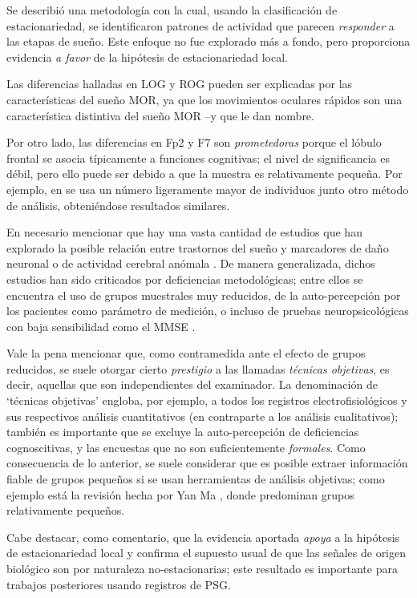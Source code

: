 \documentclass[12pt,letterpaper]{book}
\begin{document}
Se describió una metodología con la cual, usando la clasificación de estacionariedad, se identificaron patrones de actividad que parecen \textit{responder} a las etapas de sueño.
%
Este enfoque no fue explorado más a fondo, pero proporciona evidencia \textit{a favor} de la hipótesis de estacionariedad local.

Las diferencias halladas en LOG y ROG pueden ser explicadas por las características del sueño MOR, ya que los movimientos oculares rápidos son una característica distintiva del sueño MOR --y que le dan nombre.

Por otro lado, las diferencias en Fp2 y F7 son \textit{prometedoras} porque el lóbulo frontal se asocia típicamente a funciones cognitivas; el nivel de significancia es débil, pero ello puede ser debido a que la muestra es relativamente pequeña.
%
Por ejemplo, en \cite{FRONTIERS} se usa un número ligeramente mayor de individuos junto otro método de análisis, obteniéndose resultados similares.

En necesario mencionar que hay una vasta cantidad de estudios que han explorado la posible relación entre trastornos del sueño y marcadores de daño neuronal o de actividad cerebral anómala \cite{porter15}.
%
De manera generalizada, dichos estudios han sido criticados por deficiencias metodológicas; entre ellos se encuentra el uso de grupos muestrales muy reducidos, de la auto-percepción por los pacientes como parámetro de medición, o incluso de pruebas neuropsicológicas con baja sensibilidad como el MMSE \cite{scullin15}.

Vale la pena mencionar que, como {contramedida} ante el efecto de grupos reducidos, se suele otorgar cierto \textit{prestigio} a las llamadas \textit{técnicas objetivas}, es decir, aquellas que son independientes del examinador.
%
La denominación de `técnicas objetivas' engloba, por ejemplo, a todos los registros electrofisiológicos y sus respectivos análisis cuantitativos (en contraparte a los análisis cualitativos); también es importante que se excluye la auto-percepción de deficiencias cognoscitivas, y las encuestas que no son suficientemente \textit{formales}.
%
Como consecuencia de lo anterior, se suele considerar que es posible extraer información fiable de grupos pequeños si se usan herramientas de análisis objetivas; como ejemplo está la revisión hecha por Yan Ma \cite{ma18}, donde predominan grupos relativamente pequeños.

Cabe destacar, como comentario, que la evidencia aportada \textit{apoya} a la hipótesis de estacionariedad local y confirma el supuesto usual de que las señales de origen biológico son por naturaleza no-estacionarias; este resultado es importante para trabajos posteriores usando registros de PSG.
\end{document}
